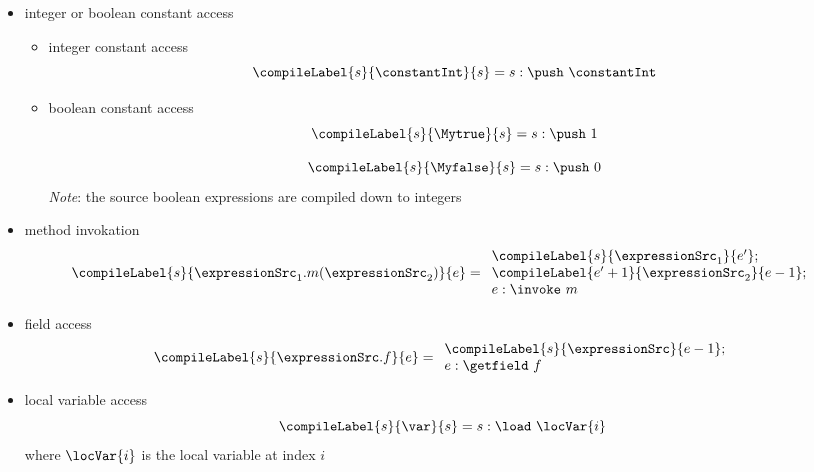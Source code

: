 \begin{itemize}
  \item  integer or boolean constant access 
     \begin{itemize}
            \item  integer constant access 
	         $$\compileLabel{s}{\constantInt}{s} = s : \push \  \constantInt $$
	    \item boolean constant access
	          $$\compileLabel{s}{\Mytrue}{s} = s: \push  \ 1 $$
                   
                  $$\compileLabel{s}{\Myfalse}{s} = s: \push \ 0 $$
		  \textit{Note}: the source boolean expressions are compiled down to integers 
     \end{itemize}
  \item  method invokation
     $$\compileLabel{s}{ \expressionSrc_1.m(\expressionSrc_2)}{e} = 
           \begin{array}{l}  
                 \compileLabel{s}{\expressionSrc_1}{e'};\\
		 \compileLabel{e' + 1}{\expressionSrc_2}{e - 1};\\
		  e  :\invoke \ m
            \end{array}     
    $$
  




\item field access
     $$\compileLabel{s}{ \expressionSrc.f}{e} =   
         \begin{array}{l}
              \compileLabel{s}{\expressionSrc}{e - 1}; \\ 
              e : \getfield  \ f
           \end{array}   
     $$ 



  
   \item local variable access
     $$\compileLabel{s}{ \var }{s} =  s: \load \ \locVar{i} $$ 
   where $\locVar{i} $ is the local variable at index $i$



\end{itemize}
